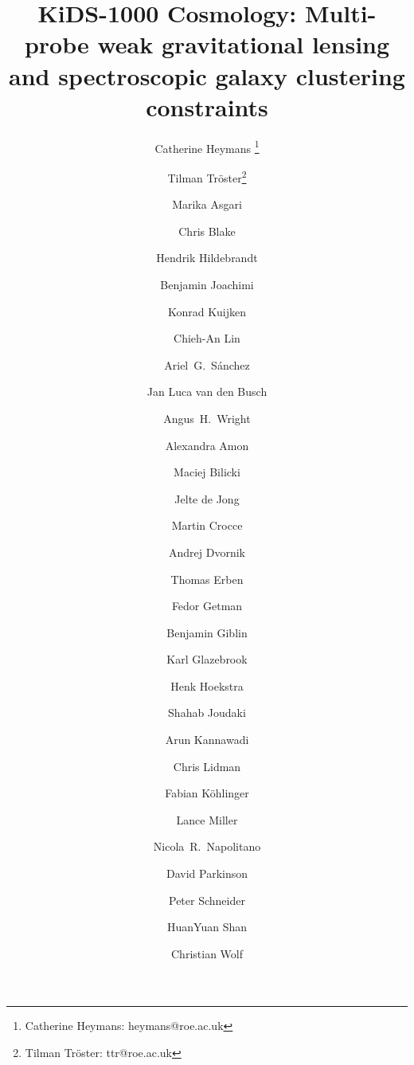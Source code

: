 \documentclass{aa}
\begin{document}
 

   \title{KiDS-1000 Cosmology: Multi-probe weak gravitational lensing and spectroscopic galaxy clustering constraints}

   \author{Catherine Heymans \thanks{Catherine Heymans: heymans@roe.ac.uk} 
   \and Tilman Tr\"oster\thanks{Tilman Tr\"oster: ttr@roe.ac.uk} 
   \and Marika Asgari 
   \and Chris Blake
   \and Hendrik Hildebrandt
   \and Benjamin Joachimi
   \and Konrad Kuijken
   \and Chieh-An Lin
   \and Ariel~G.~S\'anchez
   \and Jan Luca van den Busch
   \and Angus~H.~Wright
   \and Alexandra Amon
   \and Maciej Bilicki
   \and Jelte de Jong
   \and Martin Crocce
   \and Andrej Dvornik
   \and Thomas Erben
   \and Fedor Getman
   \and Benjamin Giblin
   \and Karl Glazebrook
   \and Henk Hoekstra
   \and Shahab Joudaki
   \and Arun Kannawadi
   \and Chris Lidman	
   \and Fabian K\"ohlinger
   \and Lance Miller
   \and Nicola~R.~Napolitano
   \and David Parkinson
   \and Peter Schneider 
   \and HuanYuan Shan
   \and Christian Wolf 
          }
\end{document}
